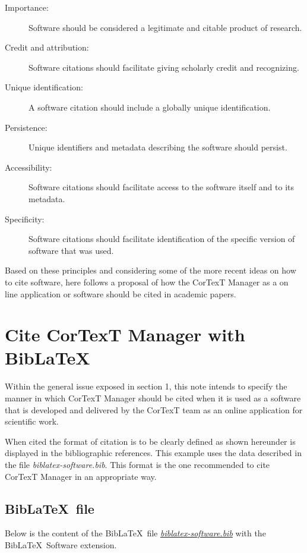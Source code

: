 \documentclass{article}
\begin{document}
\begin{description}
  \item[Importance:] Software should be considered a legitimate and citable product of research.
  \item[Credit and attribution:] Software citations should facilitate giving scholarly credit and recognizing.
  \item[Unique identification:] A software citation should include a globally unique identification.
  \item[Persistence:] Unique identifiers and metadata describing the software should persist.
  \item[Accessibility:] Software citations should facilitate access to the software itself and to its metadata.
  \item[Specificity:] Software citations should facilitate identification of the specific version of software that was used.
\end{description}

Based on these principles and considering some of the more recent ideas on how
to cite software, here follows a proposal of how the CorTexT Manager as a on
line application or software should be cited in academic papers.

\section{Cite CorTexT Manager with Bib\LaTeX} \label{example-biblatex}

Within the general issue exposed in section 1, this note intends to specify the
manner in which CorTexT Manager should be cited when it is used as a software
that is developed and delivered by the CorTexT team as an online application
for scientific work.

When cited the format of citation is to be clearly defined as shown hereunder
\cite{cortext_manager_v2} is displayed in the bibliographic references. This
example uses the data described in the file {\em biblatex-software.bib}.  This
format is the one recommended to cite CorTexT Manager in an appropriate way.

\printbibliography[type=software,title={\small References to Software (example)}]

\subsection{Bib\LaTeX \ file}

Below is the content of the Bib\LaTeX \ file
\href{https://github.com/cortext/how-to-cite-cortext/blob/main/biblatex-software.bib}{\em biblatex-software.bib}
with the Bib\LaTeX \ Software extension\cite{softwareheritageorg_citing_2020}.
\end{document}
